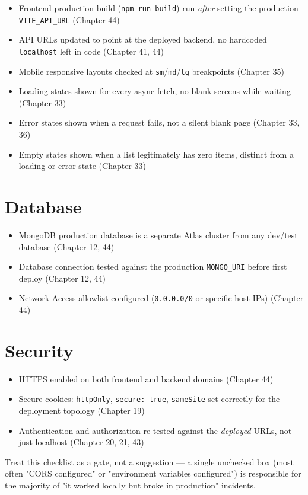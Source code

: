 \begin{itemize}
\item[$\square$] Frontend production build (\texttt{npm run build}) run
\emph{after} setting the production \texttt{VITE\_API\_URL} (Chapter 44)
\item[$\square$] API URLs updated to point at the deployed backend, no
hardcoded \texttt{localhost} left in code (Chapter 41, 44)
\item[$\square$] Mobile responsive layouts checked at \texttt{sm}/\texttt{md}/\texttt{lg}
breakpoints (Chapter 35)
\item[$\square$] Loading states shown for every async fetch, no blank
screens while waiting (Chapter 33)
\item[$\square$] Error states shown when a request fails, not a silent
blank page (Chapter 33, 36)
\item[$\square$] Empty states shown when a list legitimately has zero
items, distinct from a loading or error state (Chapter 33)
\end{itemize}

\section{Database}

\begin{itemize}
\item[$\square$] MongoDB production database is a separate Atlas cluster
from any dev/test database (Chapter 12, 44)
\item[$\square$] Database connection tested against the production
\texttt{MONGO\_URI} before first deploy (Chapter 12, 44)
\item[$\square$] Network Access allowlist configured (\texttt{0.0.0.0/0}
or specific host IPs) (Chapter 44)
\end{itemize}

\section{Security}

\begin{itemize}
\item[$\square$] HTTPS enabled on both frontend and backend domains
(Chapter 44)
\item[$\square$] Secure cookies: \texttt{httpOnly}, \texttt{secure: true},
\texttt{sameSite} set correctly for the deployment topology (Chapter 19)
\item[$\square$] Authentication and authorization re-tested against the
\emph{deployed} URLs, not just localhost (Chapter 20, 21, 43)
\end{itemize}

\begin{tipbox}[TIP]
Treat this checklist as a gate, not a suggestion --- a single unchecked
box (most often "CORS configured" or "environment variables configured")
is responsible for the majority of "it worked locally but broke in
production" incidents.
\end{tipbox}
